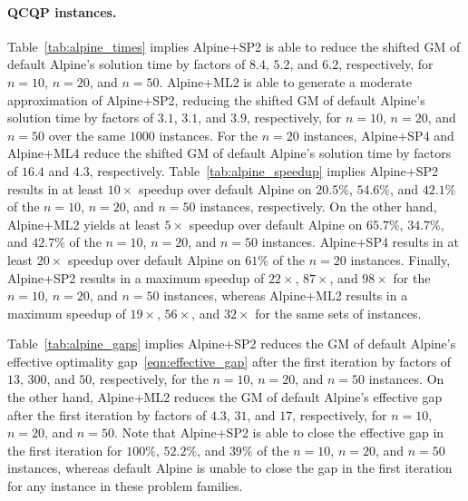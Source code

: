 \documentclass{article}
\begin{document}
\paragraph{QCQP instances.}
Table~\ref{tab:alpine_times} implies Alpine+SP2 is able to reduce the shifted GM of default Alpine's solution time by factors of $8.4$, $5.2$, and $6.2$, respectively, for $n = 10$, $n = 20$, and $n = 50$.
Alpine+ML2 is able to generate a moderate approximation of Alpine+SP2, reducing the shifted GM of default Alpine's solution time by factors of $3.1$, $3.1$, and $3.9$, respectively, for $n = 10$, $n = 20$, and $n = 50$ over the same $1000$ instances.
For the $n = 20$ instances, Alpine+SP4 and Alpine+ML4 reduce the shifted GM of default Alpine's solution time by factors of $16.4$ and $4.3$, respectively.
Table~\ref{tab:alpine_speedup} implies Alpine+SP2 results in at least $10\times$ speedup over default Alpine on $20.5\%$, $54.6\%$, and $42.1\%$ of the $n = 10$, $n = 20$, and $n = 50$ instances, respectively.
On the other hand, Alpine+ML2 yields at least $5\times$ speedup over default Alpine on $65.7\%$, $34.7\%$, and $42.7\%$ of the $n = 10$, $n = 20$, and $n = 50$ instances.
Alpine+SP4 results in at least $20\times$ speedup over default Alpine on $61\%$ of the $n = 20$ instances.
Finally, Alpine+SP2 results in a maximum speedup of $22\times$, $87\times$, and $98\times$ for the $n = 10$, $n = 20$, and $n = 50$ instances, whereas Alpine+ML2 results in a maximum speedup of $19\times$, $56\times$, and $32\times$ for the same sets of instances.

Table~\ref{tab:alpine_gaps} implies Alpine+SP2 reduces the GM of default Alpine's effective optimality gap~\eqref{eqn:effective_gap} after the first iteration by factors of $13$, $300$, and $50$, respectively, for the $n = 10$, $n = 20$, and $n = 50$ instances.
On the other hand, Alpine+ML2 reduces the GM of default Alpine's effective gap after the first iteration by factors of $4.3$, $31$, and $17$, respectively, for $n = 10$, $n = 20$, and $n = 50$.
Note that Alpine+SP2 is able to close the effective gap in the first iteration for $100\%$, $52.2\%$, and $39\%$ of the $n = 10$, $n = 20$, and $n = 50$ instances, whereas default Alpine is unable to close the gap in the first iteration for any instance in these problem families.
\end{document}
